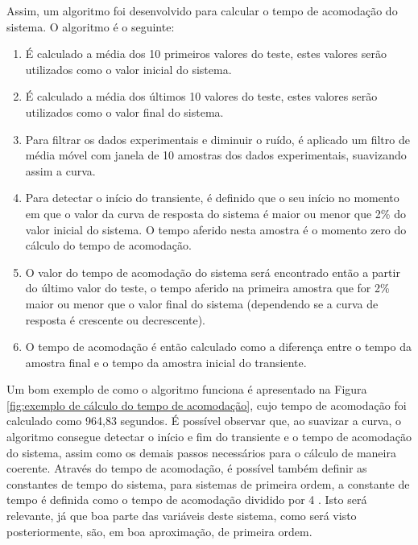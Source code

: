 Assim, um algoritmo foi desenvolvido para calcular o tempo de acomodação do sistema. O algoritmo é o seguinte:

\begin{enumerate}   
    \item É calculado a média dos 10 primeiros valores do teste, estes valores serão utilizados como o valor inicial do sistema.
    \item É calculado a média dos últimos 10 valores do teste, estes valores serão utilizados como o valor final do sistema.
    \item Para filtrar os dados experimentais e diminuir o ruído, é aplicado um filtro de média móvel com janela de 10 amostras dos dados experimentais, suavizando assim a curva.
    \item Para detectar o início do transiente, é definido que o seu início no momento em que o valor da curva de resposta do sistema é maior ou menor que 2\% do valor inicial do sistema. O tempo aferido nesta amostra é o momento zero do cálculo do tempo de acomodação.
    \item O valor do tempo de acomodação do sistema será encontrado então a partir do último valor do teste, o tempo aferido na primeira amostra que for 2\% maior ou menor que o valor final do sistema (dependendo se a curva de resposta é crescente ou decrescente).
    \item O tempo de acomodação é então calculado como a diferença entre o tempo da amostra final e o tempo da amostra inicial do transiente.
\end{enumerate}

Um bom exemplo de como o algoritmo funciona é apresentado na Figura \ref{fig:exemplo de cálculo do tempo de acomodação}, cujo tempo de acomodação foi calculado como 964,83 segundos. É possível observar que, ao suavizar a curva, o algoritmo consegue detectar o início e fim do transiente e o tempo de acomodação do sistema, assim como os demais passos necessários para o cálculo de maneira coerente. Através do tempo de acomodação, é possível também definir as constantes de tempo do sistema, para sistemas de primeira ordem, a constante de tempo é definida como o tempo de acomodação dividido por 4 \cite{ogataControle}. Isto será relevante, já que boa parte das variáveis deste sistema, como será visto posteriormente, são, em boa aproximação, de primeira ordem.

